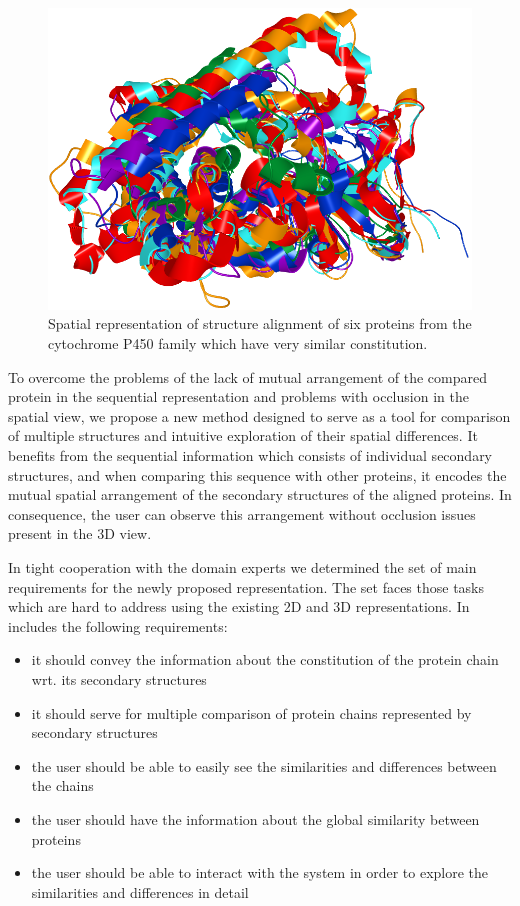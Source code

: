 \documentclass[twocolumn]{bmcart}%
\begin{document}
\begin{figure}[h!]
  \centering
  \includegraphics[width=0.9\columnwidth]{pics/many.png}
  \caption{Spatial representation of structure alignment of six proteins from the cytochrome P450 family which have very similar constitution.}
  \label{fig:many}
\end{figure}

To overcome the problems of the lack of mutual arrangement of the compared protein in the sequential representation and problems with occlusion in the spatial view, we propose a new method designed to serve as a tool for comparison of multiple structures and intuitive exploration of their spatial differences.
It benefits from the sequential information which consists of individual secondary structures, and when comparing this sequence with other proteins, it encodes the mutual spatial arrangement of the secondary structures of the aligned proteins.
In consequence, the user can observe this arrangement without occlusion issues present in the 3D view.

In tight cooperation with the domain experts we determined the set of main requirements for the newly proposed representation.
The set faces those tasks which are hard to address using the existing 2D and 3D representations.
In includes the following requirements:
\begin{itemize}
\item it should convey the information about the constitution of the protein chain wrt. its secondary structures
\item it should serve for multiple comparison of protein chains represented by secondary structures
\item the user should be able to easily see the similarities and differences between the chains
\item the user should have the information about the global similarity between proteins 
\item the user should be able to interact with the system in order to explore the similarities and differences in detail
\end{itemize}
\end{document}
